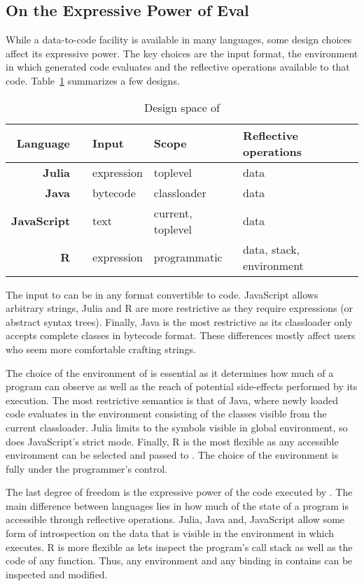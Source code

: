 \documentclass[review,screen,acmsmall]{acmart}%
\begin{document}
\subsection{On the Expressive Power of Eval}

While a data-to-code facility is available in many languages, some design
choices affect its expressive power. The key choices are the input format, the
environment in which generated code evaluates and the reflective operations
available to that code. Table~\ref{comp} summarizes a few designs.

\begin{table}[!h]\center\small\begin{tabular}{r@{~}llll}\toprule
\tiny\sc Language&&\sc\tiny Input&\sc\tiny Scope&\tiny\sc Reflective operations\\\midrule
\bf Julia&\cite{julia}     & expression& toplevel         & data\\
\bf Java&\cite{cl}  & bytecode  & classloader       & data\\
\bf JavaScript&\cite{ecoop11}& text      & current, toplevel& data\\
\bf R&\cite{R96}  & expression& programmatic      & data, stack, environment\\\bottomrule
\end{tabular}\caption{Design space of \eval}\label{comp}
\end{table}

The input to \eval can be in any format convertible to code. JavaScript allows
arbitrary strings, Julia and R are more restrictive as they require expressions
(or abstract syntax trees). Finally, Java is the most restrictive as its
classloader only accepts complete classes in bytecode format. These differences
mostly affect users who seem more comfortable crafting strings.

The choice of the environment of \eval is essential as it determines how much of
a program \eval can observe as well as the reach of potential side-effects
performed by its execution. The most restrictive semantics is that of Java,
where newly loaded code evaluates in the environment consisting of the classes
visible from the current classloader. Julia limits \eval to the symbols visible
in global environment, so does JavaScript's strict mode. Finally, R is the most
flexible as any accessible environment can be selected and passed to \eval. The
choice of the environment is fully under the programmer's control.

The last degree of freedom is the expressive power of the code executed by
\eval. The main difference between languages lies in how much of the state of a
program is accessible through reflective operations. Julia, Java and, JavaScript
allow some form of introspection on the data that is visible in the environment
in which \eval executes. R is more flexible as lets \eval inspect the program's
call stack as well as the code of any function. Thus, any environment and any
binding in contains can be inspected and modified.
\end{document}
